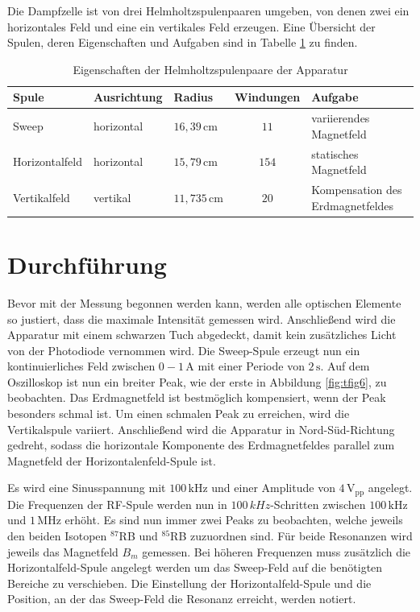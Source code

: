 Die Dampfzelle ist von drei Helmholtzspulenpaaren umgeben, von denen zwei ein horizontales Feld und eine ein vertikales Feld erzeugen.
Eine Übersicht der Spulen, deren Eigenschaften und Aufgaben sind in Tabelle \ref{tab:ttab1} zu finden.
\FloatBarrier
\begin{table}[h]
    \centering
    \caption{Eigenschaften der Helmholtzspulenpaare der Apparatur}
    \label{tab:ttab1}
    \begin{tabular}{l l l c l}
        \toprule
        {Spule} & {Ausrichtung} & {Radius} & {Windungen} & {Aufgabe} \\
        \midrule
        Sweep & horizontal & $16,39\,\si{\cm}$ & $11$ & variierendes Magnetfeld\\
        Horizontalfeld & horizontal & $15,79\,\si{\cm}$ & $154$ & statisches Magnetfeld\\
        Vertikalfeld & vertikal & $11,735\,\si{\cm}$ & $20$ & Kompensation des Erdmagnetfeldes\\
        \bottomrule
    \end{tabular}
\end{table}
\FloatBarrier
\noindent

\section{Durchführung}
Bevor mit der Messung begonnen werden kann, werden alle optischen Elemente so justiert, dass die maximale Intensität gemessen wird.
Anschließend wird die Apparatur mit einem schwarzen Tuch abgedeckt, damit kein zusätzliches Licht von der Photodiode vernommen wird.
Die Sweep-Spule erzeugt nun ein kontinuierliches Feld zwischen $0-1\,\si{\A}$ mit einer Periode von $2\,\si{\s}$.
Auf dem Oszilloskop ist nun ein breiter Peak, wie der erste in Abbildung \ref{fig:tfig6}, zu beobachten.
Das Erdmagnetfeld ist bestmöglich kompensiert, wenn der Peak besonders schmal ist.
Um einen schmalen Peak zu erreichen, wird die Vertikalspule variiert.
Anschließend wird die Apparatur in Nord-Süd-Richtung gedreht, sodass die horizontale Komponente des Erdmagnetfeldes parallel zum Magnetfeld der Horizontalenfeld-Spule ist.

Es wird eine Sinusspannung mit $100\,\si{\kHz}$ und einer Amplitude von $4\,\text{V}_{\text{pp}}$ angelegt.
Die Frequenzen der RF-Spule werden nun in $100\,\si{kHz}$-Schritten zwischen $100\,\si{\kHz}$ und $1\,\si{\MHz}$ erhöht.
Es sind nun immer zwei Peaks zu beobachten, welche jeweils den beiden Isotopen $^{87}$RB und $^{85}$RB zuzuordnen sind.
Für beide Resonanzen wird jeweils das Magnetfeld $B_m$ gemessen.
Bei höheren Frequenzen muss zusätzlich die Horizontalfeld-Spule angelegt werden um das Sweep-Feld auf die benötigten Bereiche zu verschieben.
Die Einstellung der Horizontalfeld-Spule und die Position, an der das Sweep-Feld die Resonanz erreicht, werden notiert.

